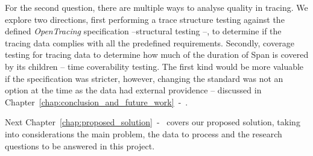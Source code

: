 For the second question, there are multiple ways to analyse quality in tracing. We explore two directions, first performing a trace structure testing against the defined \emph{OpenTracing} specification --structural testing --, to determine if the tracing data complies with all the predefined requirements. Secondly, coverage testing for tracing data to determine how much of the duration of Span is covered by its children -- time coverability testing. The first kind would be more valuable if the specification was stricter, however, changing the standard was not an option at the time as the data had external providence -- discussed in Chapter~\ref{chap:conclusion_and_future_work}~-~.

Next Chapter~\ref{chap:proposed_solution}~-~ covers our proposed solution, taking into considerations the main problem, the data to process and the research questions to be answered in this project.

\checkoddpage
{}
{ %
    \newpage
    \blankpage}
{ %
}